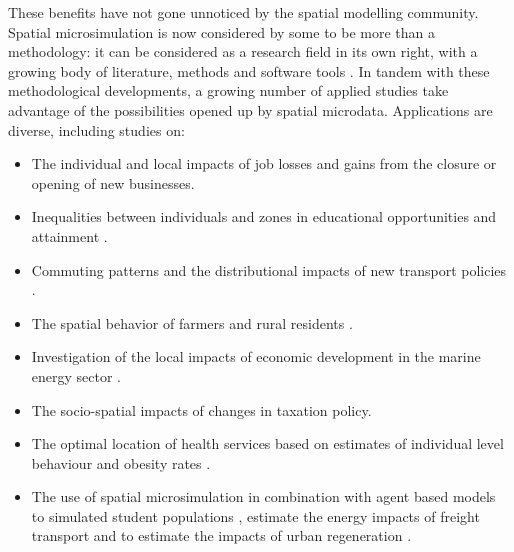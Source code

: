 \documentclass[a4paper,10pt]{article}
\begin{document}

These benefits have not gone unnoticed by the spatial modelling community.
Spatial microsimulation is now considered by some to be more than a methodology:
it can be considered as a research field in its
own right, with a growing body of literature, methods and software tools \citep{Tanton2013}.
In tandem with these methodological developments, a growing number of applied studies
take advantage of the possibilities opened up by spatial microdata.
Applications are diverse, including studies on:
\begin{itemize}
 \item The individual and local impacts
of job losses and gains from the closure \citep{Ballas2006}
or opening \citep{VanLeeuwen2010} of new businesses.
\item Inequalities between individuals and zones in educational opportunities
and attainment \citep{Kavroudakis2012}.
\item Commuting patterns and the distributional impacts
of new transport policies \citep{Lovelace2014-jtg}.
\item The spatial behavior of farmers and rural residents
\citep{Hynes2009,van2013determinants}.
\item Investigation of the local impacts of economic development
in the marine energy sector \citep{Morrissey2013a}.
\item The socio-spatial impacts of changes in taxation policy.
\item The optimal location of health services based
on estimates of individual level behaviour and obesity rates \citep{Tomintz2008,Clarke2010-valid}.
\item The use of spatial microsimulation in combination with
agent based models to simulated student populations \citep{Wu2010},
estimate the energy impacts of freight transport \citep{Zuo2013a}
and to estimate the impacts of urban regeneration \citep{jordan2011agent}.
\end{itemize}
\end{document}
